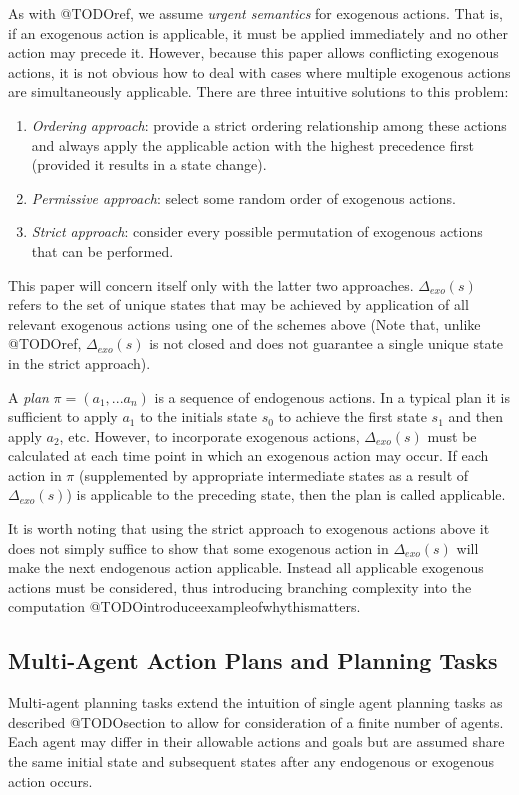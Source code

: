 \documentclass{article}
\theoremstyle{plain}
\theoremstyle{definition}
\begin{document}
As with @TODOref, we assume \textit{urgent semantics} for exogenous actions. That is, if an exogenous action is applicable, it must be applied immediately and no other action may precede it. However, because this paper allows conflicting exogenous actions, it is not obvious how to deal with cases where multiple exogenous actions are simultaneously applicable. There are three intuitive solutions to this problem:
\begin{enumerate}
\item \textit{Ordering approach}: provide a strict ordering relationship among these actions and always apply the applicable action with the highest precedence first (provided it results in a state change).
\item \textit{Permissive approach}: select some random order of exogenous actions.
\item \textit{Strict approach}: consider every possible permutation of exogenous actions that can be performed.
\end{enumerate}

This paper will concern itself only with the latter two approaches. $\Delta_{exo}(s)$ refers to the set of unique states that may be achieved by application of all relevant exogenous actions using one of the schemes above (Note that, unlike @TODOref, $\Delta_{exo}(s)$ is not closed and does not guarantee a single unique state in the strict approach).

A \textit{plan} $\pi=(a_1,...a_n)$ is a sequence of endogenous actions. In a typical plan it is sufficient to apply $a_1$ to the initials state $s_0$ to achieve the first state $s_1$ and then apply $a_2$, etc. However, to incorporate exogenous actions, $\Delta_{exo}(s)$ must be calculated at each time point in which an exogenous action may occur. If each action in $\pi$ (supplemented by appropriate intermediate states as a result of $\Delta_{exo}(s)$) is applicable to the preceding state, then the plan is called applicable. 

It is worth noting that using the strict approach to exogenous actions above it does not simply suffice to show that some exogenous action in $\Delta_{exo}(s)$ will make the next endogenous action applicable. Instead all applicable exogenous actions must be considered, thus introducing branching complexity into the computation @TODOintroduceexampleofwhythismatters.



\subsection{Multi-Agent Action Plans and Planning Tasks}
Multi-agent planning tasks extend the intuition of single agent planning tasks as described @TODOsection to allow for consideration of a finite number of agents. Each agent may differ in their allowable actions and goals but are assumed share the same initial state and subsequent states after any endogenous or exogenous action occurs.
\end{document}
